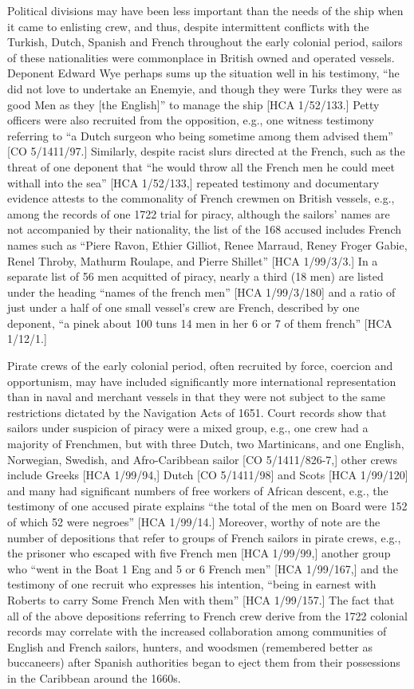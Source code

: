 Political divisions may have been less important than the needs of the ship when it came to enlisting crew, and thus, despite intermittent conflicts with the Turkish, Dutch, Spanish and French throughout the early colonial period, sailors of these nationalities were commonplace in British owned and operated vessels. Deponent Edward Wye perhaps sums up the situation well in his testimony, “he did not love to undertake an Enemyie, and though they were Turks they were as good Men as they [the English]” to manage the ship [HCA 1/52/133.] Petty officers were also recruited from the opposition, e.g., one witness testimony referring to “a Dutch surgeon who being sometime among them advised them” [CO 5/1411/97.] Similarly, despite racist slurs directed at the French, such as the threat of one deponent that “he would throw all the French men he could meet withall into the sea” [HCA 1/52/133,] repeated testimony and documentary evidence attests to the commonality of French crewmen on British vessels, e.g., among the records of one 1722 trial for piracy, although the sailors’ names are not accompanied by their nationality, the list of the 168 accused includes French names such as “Piere Ravon, Ethier Gilliot, Renee Marraud, Reney Froger Gabie, Renel Throby, Mathurm Roulape, and Pierre Shillet” [HCA 1/99/3/3.] In a separate list of 56 men acquitted of piracy, nearly a third (18 men) are listed under the heading “names of the french men” [HCA 1/99/3/180] and a ratio of just under a half of one small vessel’s crew are French, described by one deponent, “a pinek about 100 tuns 14 men in her 6 or 7 of them french” [HCA 1/12/1.] 

Pirate crews of the early colonial period, often recruited by force, coercion and opportunism, may have included significantly more international representation than in naval and merchant vessels in that they were not subject to the same restrictions dictated by the Navigation Acts of 1651. Court records show that sailors under suspicion of piracy were a mixed group, e.g., one crew had a majority of Frenchmen, but with three Dutch, two Martinicans, and one English, Norwegian, Swedish, and Afro-Caribbean sailor [CO 5/1411/826-7,] other crews include Greeks [HCA 1/99/94,] Dutch  [CO 5/1411/98] and Scots [HCA 1/99/120] and many had significant numbers of free workers of African descent, e.g., the testimony of one accused pirate explains “the total of the men on Board were 152 of which 52 were negroes” [HCA 1/99/14.] Moreover, worthy of note are the number of depositions that refer to groups of French sailors in pirate crews, e.g., the prisoner who escaped with five French men [HCA 1/99/99,] another group who “went in the Boat 1 Eng and 5 or 6 French men” [HCA 1/99/167,] and the testimony of one recruit who expresses his intention, “being in earnest with Roberts to carry Some French Men with them” [HCA 1/99/157.] The fact that all of the above depositions referring to French crew derive from the 1722 colonial records may correlate with the increased collaboration among communities of English and French sailors, hunters, and woodsmen (remembered better as buccaneers) after Spanish authorities began to eject them from their possessions in the Caribbean around the 1660s.

